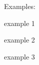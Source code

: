 \documentclass{report}
\begin{document}
\lipsum[1-4]
\lipsum[5][1-18]
Examples:\nopagebreak

example 1

example 2

example 3
\end{document}
